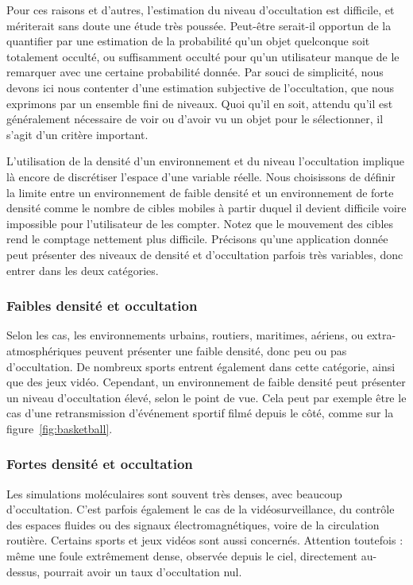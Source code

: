 	Pour ces raisons et d'autres, l'estimation du niveau d'occultation est difficile, et mériterait sans doute une étude très poussée. Peut-être serait-il opportun de la quantifier par une estimation de la probabilité qu'un objet quelconque soit totalement occulté, ou suffisamment occulté pour qu'un utilisateur manque de le remarquer avec une certaine probabilité donnée. Par souci de simplicité, nous devons ici nous contenter d'une estimation subjective de l'occultation, que nous exprimons par un ensemble fini de niveaux. Quoi qu'il en soit, attendu qu'il est généralement nécessaire de voir ou d'avoir vu un objet pour le sélectionner, il s'agit d'un critère important.
	
	L'utilisation de la densité d'un environnement et du niveau l'occultation implique là encore de discrétiser l'espace d'une variable réelle. Nous choisissons de définir la limite entre un environnement de faible densité et un environnement de forte densité comme le nombre de cibles mobiles à partir duquel il devient difficile voire impossible pour l'utilisateur de les compter. Notez que le mouvement des cibles rend le comptage nettement plus difficile. Précisons qu'une application donnée peut présenter des niveaux de densité et d'occultation parfois très variables, donc entrer dans les deux catégories.
	
	\subsubsection{Faibles densité et occultation}
	Selon les cas, les environnements urbains, routiers, maritimes, aériens, ou extra-atmosphériques peuvent présenter une faible densité, donc peu ou pas d'occultation. De nombreux sports entrent également dans cette catégorie, ainsi que des jeux vidéo. Cependant, un environnement de faible densité peut présenter un niveau d'occultation élevé, selon le point de vue. Cela peut par exemple être le cas d'une retransmission d'événement sportif filmé depuis le côté, comme sur la figure~\ref{fig:basketball}.
	
	\subsubsection{Fortes densité et occultation}
	Les simulations moléculaires sont souvent très denses, avec beaucoup d'occultation. C'est parfois également le cas de la vidéosurveillance, du contrôle des espaces fluides ou des signaux électromagnétiques, voire de la circulation routière. Certains sports et jeux vidéos sont aussi concernés. Attention toutefois : même une foule extrêmement dense, observée depuis le ciel, directement au-dessus, pourrait avoir un taux d'occultation nul.
	
